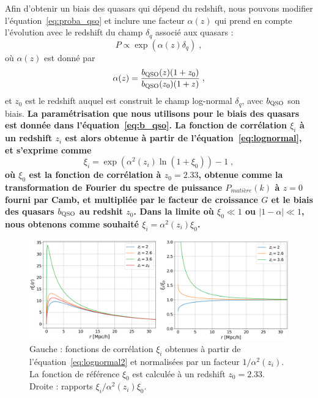 \documentclass[11pt, twoside, a4paper, openright]{report}
\begin{document}
Afin d'obtenir un biais des quasars qui dépend du redshift, nous pouvons modifier l'équation~\ref{eq:proba_qso} et inclure une facteur $\alpha(z)$ qui prend en compte l'évolution avec le redshift du champ $\delta_q$ associé aux quasars :
\begin{equation}
  \label{eq:proba_qso2}
  P \propto \exp(\alpha(z)\delta_q) \; ,
\end{equation}
où $\alpha(z)$ est donné par
\begin{equation}
  \alpha(z) = \frac{b_{\textsc{QSO}}(z) (1+z_0)}{b_{\textsc{QSO}}(z_0)(1+z)} \; ,
\end{equation}
et $z_0$ est le redshift auquel est construit le champ log-normal $\delta_q$, avec $b_{\textsc{QSO}}$ son biais.
\textbf{
  La paramétrisation que nous utilisons pour le biais des quasars est donnée dans l'équation~\ref{eq:b_qso}.
  La fonction de corrélation $\xi_i$ à un redshift $z_i$ est alors obtenue à partir de l'équation~\ref{eq:lognormal}, et s'exprime comme
  \begin{equation}
    \label{eq:lognormal2}
    \xi_i = \exp(\alpha^2(z_i) \ln (1 + \xi_0)) - 1 \; ,
  \end{equation}
  où $\xi_0$ est la fonction de corrélation à $z_0 = \num{2.33}$, obtenue comme la transformation de Fourier du spectre de puissance $P_{matière}(k)$ à $z=0$ fourni par Camb, et multipliée par le facteur de croissance $G$ et le biais des quasars $b_{\textsc{QSO}}$ au redshit $z_0$.
  Dans la limite où $\xi_0 \ll 1$ ou $|1 - \alpha | \ll 1$, nous obtenons comme souhaité $\xi_i = \alpha^2(z_i) \xi_0$.
}
\begin{figure}
  \centering
  \includegraphics[scale=0.4]{qsolognormal1}
  \caption{Gauche : fonctions de corrélation $\xi_i$ obtenues à partir de l'équation~\ref{eq:lognormal2} et normalisées par un facteur $1 / \alpha^2(z_i)$. La fonction de référence $\xi_0$ est calculée à un redshift $z_0 = \num{2.33}$. Droite : rapports $\xi_i / \alpha^2(z_i) \xi_0$.}
  \label{fig:qsolognormal1}
\end{figure}
\end{document}
